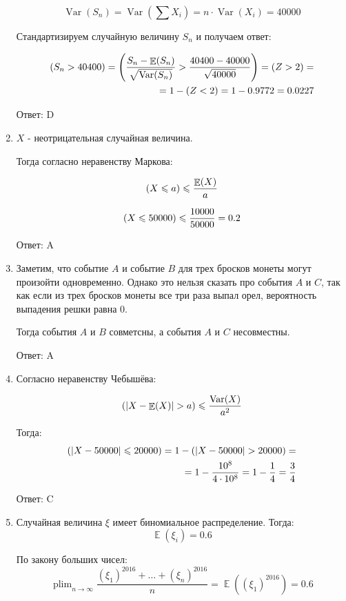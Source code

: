 \documentclass[a4paper]{article} %
\DeclareMathOperator*\plim{plim}
\DeclareMathOperator{\Var}{Var}
\DeclareMathOperator{\E}{\mathbb{E}}
\let\P\relax
\DeclareMathOperator{\P}{\mathbb{P}}
\renewcommand{\leq}{\leqslant}
\begin{document}
\begin{enumerate}
    \[\Var(S_n) = \Var\left(\sum X_i\right) = n \cdot \Var(X_i) = 40000\]
    
    Стандартизируем случайную величину $S_n$ и получаем ответ:
    
    \begin{align*}
    \P(S_n > 40400) = \P\left(\frac{S_n - \E(S_n)}{\sqrt{\Var(S_n)}} > \frac{40400 - 40000}{\sqrt{40000}}\right) = \P(Z > 2)= \\
    = 1 -\P(Z < 2) = 1 - 0.9772 = 0.0227
    \end{align*}
    
    Ответ: D
    
    \item
    $X$ - неотрицательная случайная величина. 
    
    Тогда согласно неравенству Маркова:

    \[\P({X} \leq a) \leq \frac{\E(X)}{a}\]
    
    \[\P({X} \leq 50000) \leq \frac{10000}{50000} = 0.2\]
    
    Ответ: A
    
    \item
    
    Заметим, что событие $A$ и событие $B$ для трех бросков монеты могут произойти одновременно. Однако это нельзя сказать про события $A$ и $C$, так как если из трех бросков монеты все три раза выпал орел, вероятность выпадения решки равна 0.
    
    Тогда события $A$ и $B$ совметсны, а события $A$ и $C$ несовместны.
    
    Ответ: A
    
    \item

    Согласно неравенству Чебышёва:
    
    \[\P(\abs{X - \E(X)} > a) \leq \frac{\Var(X)}{a^2}\]
    
    Тогда:
    \begin{align*}
    \P(\abs{X- 50000} \leq 20000) = 1 - \P(\abs{X- 50000} > 20000) = \\
    =1 - \frac{10^8}{4 \cdot 10^8} = 1 - \frac{1}{4} = \frac{3}{4}
    \end{align*}
    
    Ответ: C
    
    \item
    Случайная величина $\xi$ имеет биномиальное распределение.
    Тогда:
    \[\E(\xi_i) = 0.6\]
    
    По закону больших чисел:
    \[\plim_{n\to\infty} \frac{(\xi_1)^{2016} + \ldots + (\xi_n)^{2016}}{n} = \E((\xi_1)^{2016}) = 0.6\]
    

\end{enumerate}
\end{document}
